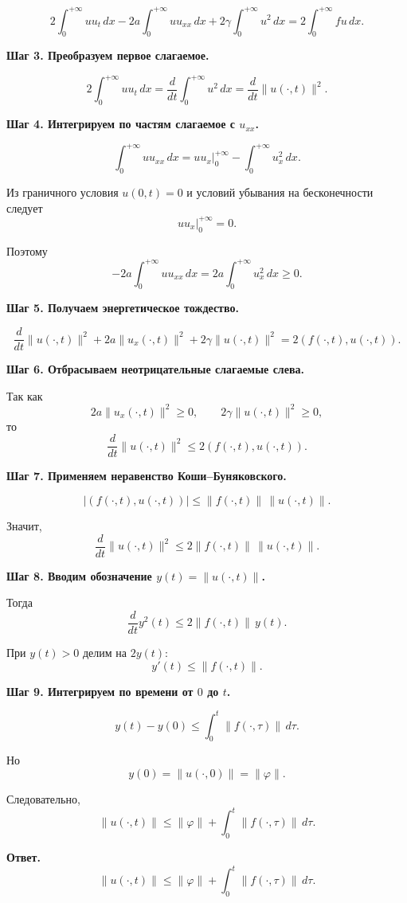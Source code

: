 \documentclass[a4paper,12pt]{article}
\begin{document}
\[
2\int_0^{+\infty}u u_t\,dx
-2a\int_0^{+\infty}u u_{xx}\,dx
+2\gamma\int_0^{+\infty}u^2\,dx
=
2\int_0^{+\infty}fu\,dx.
\]

\textbf{Шаг 3. Преобразуем первое слагаемое.}

\[
2\int_0^{+\infty}u u_t\,dx
=
\frac{d}{dt}\int_0^{+\infty}u^2\,dx
=
\frac{d}{dt}\|u(\cdot,t)\|^2.
\]

\textbf{Шаг 4. Интегрируем по частям слагаемое с $u_{xx}$.}

\[
\int_0^{+\infty}u u_{xx}\,dx
=
\left.u u_x\right|_0^{+\infty}
-\int_0^{+\infty}u_x^2\,dx.
\]

Из граничного условия $u(0,t)=0$ и условий убывания на бесконечности следует
\[
\left.u u_x\right|_0^{+\infty}=0.
\]

Поэтому
\[
-2a\int_0^{+\infty}u u_{xx}\,dx
=
2a\int_0^{+\infty}u_x^2\,dx\ge 0.
\]

\textbf{Шаг 5. Получаем энергетическое тождество.}

\[
\frac{d}{dt}\|u(\cdot,t)\|^2
+2a\|u_x(\cdot,t)\|^2
+2\gamma\|u(\cdot,t)\|^2
=
2(f(\cdot,t),u(\cdot,t)).
\]

\textbf{Шаг 6. Отбрасываем неотрицательные слагаемые слева.}

Так как
\[
2a\|u_x(\cdot,t)\|^2\ge 0,
\qquad
2\gamma\|u(\cdot,t)\|^2\ge 0,
\]
то
\[
\frac{d}{dt}\|u(\cdot,t)\|^2
\le
2(f(\cdot,t),u(\cdot,t)).
\]

\textbf{Шаг 7. Применяем неравенство Коши--Буняковского.}

\[
|(f(\cdot,t),u(\cdot,t))|
\le
\|f(\cdot,t)\|\,\|u(\cdot,t)\|.
\]

Значит,
\[
\frac{d}{dt}\|u(\cdot,t)\|^2
\le
2\|f(\cdot,t)\|\,\|u(\cdot,t)\|.
\]

\textbf{Шаг 8. Вводим обозначение $y(t)=\|u(\cdot,t)\|$.}

Тогда
\[
\frac{d}{dt}y^2(t)\le 2\|f(\cdot,t)\|\,y(t).
\]

При $y(t)>0$ делим на $2y(t)$:
\[
y'(t)\le \|f(\cdot,t)\|.
\]

\textbf{Шаг 9. Интегрируем по времени от $0$ до $t$.}

\[
y(t)-y(0)\le \int_0^t \|f(\cdot,\tau)\|\,d\tau.
\]

Но
\[
y(0)=\|u(\cdot,0)\|=\|\varphi\|.
\]

Следовательно,
\[
\|u(\cdot,t)\|
\le
\|\varphi\|
+\int_0^t \|f(\cdot,\tau)\|\,d\tau.
\]

\textbf{Ответ.}
\[
\|u(\cdot,t)\|
\le
\|\varphi\|
+\int_0^t \|f(\cdot,\tau)\|\,d\tau.
\]
\end{document}
